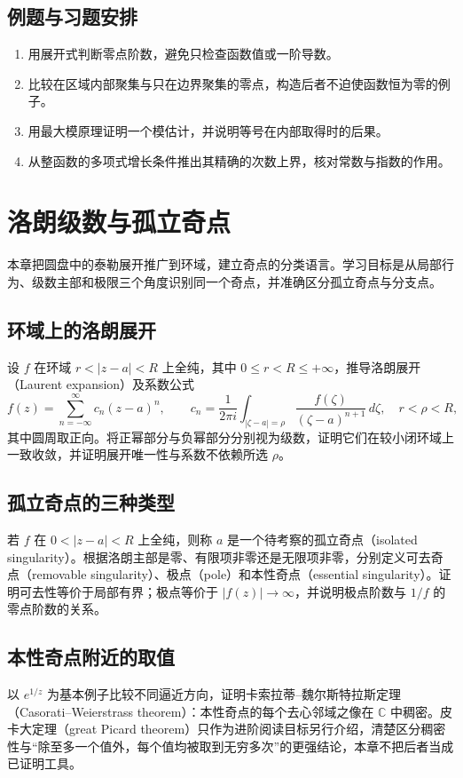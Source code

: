 \documentclass[UTF8,12pt,a4paper,fontset=fandol]{ctexbook}
\begin{document}
\section{例题与习题安排}
\begin{enumerate}
  \item 用展开式判断零点阶数，避免只检查函数值或一阶导数。
  \item 比较在区域内部聚集与只在边界聚集的零点，构造后者不迫使函数恒为零的例子。
  \item 用最大模原理证明一个模估计，并说明等号在内部取得时的后果。
  \item 从整函数的多项式增长条件推出其精确的次数上界，核对常数与指数的作用。
\end{enumerate}

\chapter{洛朗级数与孤立奇点}
\label{chap:ca-singularities}

本章把圆盘中的泰勒展开推广到环域，建立奇点的分类语言。学习目标是从局部行为、级数主部和极限三个角度识别同一个奇点，并准确区分孤立奇点与分支点。

\section{环域上的洛朗展开}
设 $f$ 在环域 $r<|z-a|<R$ 上全纯，其中 $0\le r<R\le+\infty$，推导洛朗展开（Laurent expansion）及系数公式
\begin{equation}
  f(z)=\sum_{n=-\infty}^{\infty}c_n(z-a)^n,\qquad
  c_n=\frac{1}{2\pi i}\int_{|\zeta-a|=\rho}
       \frac{f(\zeta)}{(\zeta-a)^{n+1}}\,d\zeta,
  \quad r<\rho<R,
  \label{eq:ca-laurent}
\end{equation}
其中圆周取正向。将正幂部分与负幂部分分别视为级数，证明它们在较小闭环域上一致收敛，并证明展开唯一性与系数不依赖所选 $\rho$。

\section{孤立奇点的三种类型}
若 $f$ 在 $0<|z-a|<R$ 上全纯，则称 $a$ 是一个待考察的孤立奇点（isolated singularity）。根据洛朗主部是零、有限项非零还是无限项非零，分别定义可去奇点（removable singularity）、极点（pole）和本性奇点（essential singularity）。证明可去性等价于局部有界；极点等价于 $|f(z)|\to\infty$，并说明极点阶数与 $1/f$ 的零点阶数的关系。

\section{本性奇点附近的取值}
以 $e^{1/z}$ 为基本例子比较不同逼近方向，证明卡索拉蒂--魏尔斯特拉斯定理（Casorati--Weierstrass theorem）：本性奇点的每个去心邻域之像在 $\mathbb{C}$ 中稠密。皮卡大定理（great Picard theorem）只作为进阶阅读目标另行介绍，清楚区分稠密性与“除至多一个值外，每个值均被取到无穷多次”的更强结论，本章不把后者当成已证明工具。
\end{document}
